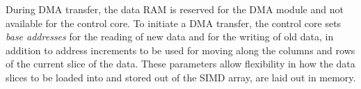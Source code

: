 During \ac{DMA} transfer, the data \ac{RAM} is reserved for the \ac{DMA} module
and not available for the control core. To initiate a \ac{DMA} transfer,
the control core sets \emph{base addresses} for the reading of new data and for
the writing of old data, in addition to address increments to be used for moving
along the columns and rows of the current slice of the data. These parameters
allow flexibility in how the data slices to be loaded into and stored out of the
\ac{SIMD} array, are laid out in memory.
